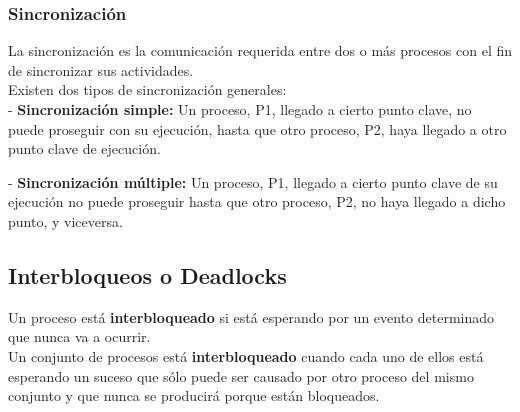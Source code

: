 \documentclass[spanish, 12pt]{article}
\begin{document}
				\newpage
				
			\subsubsection{Sincronización}
				
				La sincronización es la comunicación requerida entre dos o más procesos con el fin de sincronizar sus actividades.\\
				
				Existen dos tipos de sincronización generales:\\
					
				- \textbf{Sincronización simple:} Un proceso, P1, llegado a cierto punto clave, no puede proseguir con su ejecución, hasta que otro proceso, P2, haya llegado a otro punto clave de ejecución.\\
					
				\begin{figure}[H]
					\centerline{}
				\end{figure}
					
				- \textbf{Sincronización múltiple:} Un proceso, P1, llegado a cierto punto clave de su ejecución no puede proseguir hasta que otro proceso, P2, no haya llegado a dicho punto, y viceversa.\\
					
				\begin{figure}[H]
					\centerline{}
				\end{figure}
			
				\newpage
					
		\subsection{Interbloqueos o Deadlocks}
		
			Un proceso está \textbf{interbloqueado} si está esperando por un evento determinado que nunca va a ocurrir.\\
		
			Un conjunto de procesos está \textbf{interbloqueado} cuando cada uno de ellos está esperando un suceso que sólo puede ser causado por otro proceso del mismo conjunto y que nunca se producirá porque están bloqueados.\\
		
\end{document}
